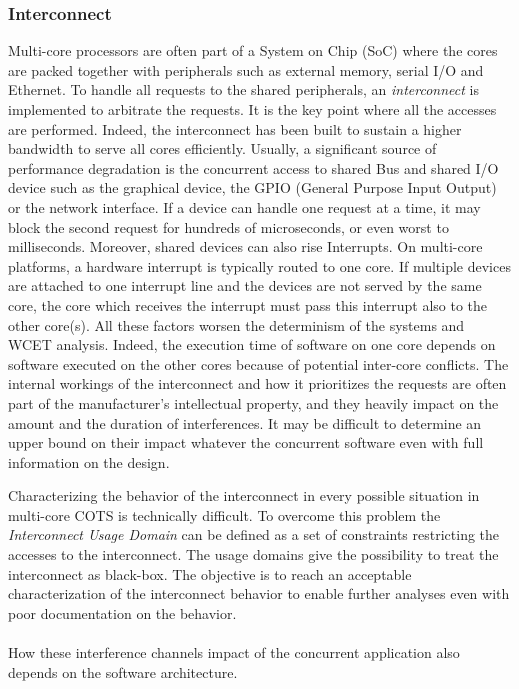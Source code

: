 \subsubsection{Interconnect}
Multi-core processors are often part of a System on Chip (SoC) where the cores are packed together with peripherals such as external memory, serial I/O and Ethernet. To handle all requests to the shared peripherals, an \emph{interconnect} is implemented to arbitrate the requests. It is the key point where all the accesses are performed. Indeed, the interconnect has been built to sustain a higher bandwidth to serve all cores efficiently. Usually, a significant source of performance degradation is the concurrent access to shared Bus and shared I/O device such as the graphical device, the GPIO (General Purpose Input Output) or the network interface. If a device can handle one request at a time, it may block the second request for hundreds of microseconds, or even worst to milliseconds. Moreover, shared devices can also rise Interrupts. On multi-core platforms, a hardware interrupt is typically routed to one core. If multiple devices are attached to one interrupt line and the devices are not served by the same core, the core which receives the interrupt must pass this interrupt also to the other core(s). All these factors worsen the determinism of the systems and WCET analysis. Indeed, the execution time of software on one core depends on software executed on the other cores because of potential inter-core conflicts. The internal workings of the interconnect and how it prioritizes the requests are often part of the manufacturer's intellectual property, and they heavily impact on the amount and the duration of interferences. It may be difficult to determine an upper bound on their impact whatever the concurrent software even with full information on the design.
\par Characterizing the behavior of the interconnect in every possible situation in multi-core COTS is technically difficult. To overcome this problem the \emph{Interconnect Usage Domain} can be defined as a set of constraints restricting the accesses to the interconnect. The usage domains give the possibility to treat the interconnect as black-box. The objective is to reach an acceptable characterization of the interconnect behavior to enable further analyses even with poor documentation on the behavior.

\paragraph{} How these interference channels impact of the concurrent application also depends on the software architecture.

